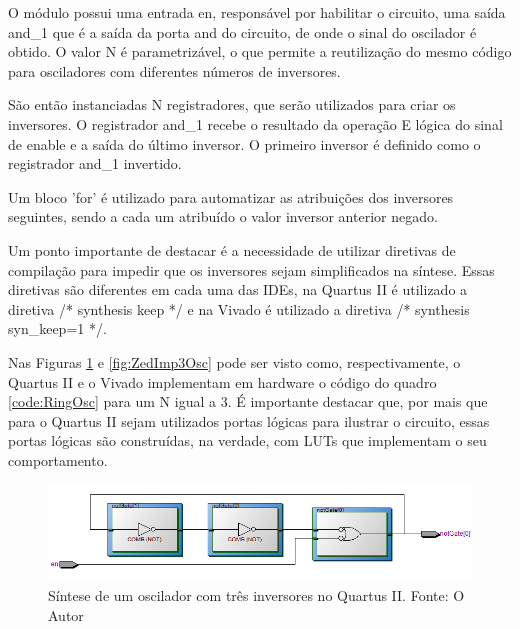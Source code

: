 O módulo possui uma entrada en, responsável por habilitar o circuito, uma saída and\_1 que é a saída da porta and do circuito, de onde o sinal do oscilador é obtido. O valor N é parametrizável, o que permite a reutilização do mesmo código para osciladores com diferentes números de inversores.

São então instanciadas N registradores, que serão utilizados para criar os inversores. O registrador and\_1 recebe o resultado da operação E lógica do sinal de enable e a saída do último inversor. O primeiro inversor é definido como o registrador and\_1 invertido.

Um bloco 'for' é utilizado para automatizar as atribuições dos inversores seguintes, sendo a cada um atribuído o valor inversor anterior negado.

Um ponto importante de destacar é a necessidade de utilizar diretivas de compilação para impedir que os inversores sejam simplificados na síntese. Essas diretivas são diferentes em cada uma das IDEs, na Quartus II é utilizado a diretiva /* synthesis keep */ e na Vivado é utilizado a diretiva /* synthesis syn\_keep=1 */.


Nas Figuras \ref{fig:DE2Imp3Osc} e \ref{fig:ZedImp3Osc} pode ser visto como, respectivamente, o Quartus II e o Vivado implementam em hardware o código do quadro \ref{code:RingOsc} para um N igual a 3. É importante destacar que, por mais que para o Quartus II sejam utilizados portas lógicas para ilustrar o circuito, essas portas lógicas são construídas, na verdade, com LUTs que implementam o seu comportamento.

\begin{figure}[H]
    \centering
    \includegraphics[width=\linewidth]{figures/Metodologia/DE2_Implementation_3Inverter_Gates.png}
    \caption{Síntese de um oscilador com três inversores no Quartus II. Fonte: O Autor}
    \label{fig:DE2Imp3Osc}
\end{figure}


